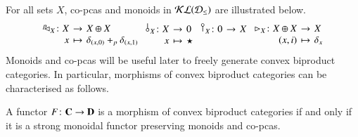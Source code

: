 For all sets $X$, co-pcas and monoids in $\mathcal{KL}(\mathcal{D}_{\leq})$ are illustrated below.
\begin{equation}\label{ex:comonoids}
\arraycolsep=2pt%
\begin{array}{cccc}
\begin{array}{rcl}
\diagp{X} \colon  X & \to & X \oplus X \\
x & \mapsto & \delta_{(x,0)}+_p\delta_{(x,1)}%
\end{array}
&
\begin{array}{rcl}
\bang{X}  \colon X & \to & \zero\\
x & \mapsto& \star
\end{array}
&
\begin{array}{rcl}
\cobang{X}\colon  \zero &\to& X\\
\text{ }
\end{array}
&
\begin{array}{rcl}
\codiag{X}  \colon  X\oplus X & \to & X\\
(x,i) & \mapsto& \delta_{x}
\end{array}
\end{array}
\end{equation}
Monoids and co-pcas will be useful later to freely generate convex biproduct categories. In particular, morphisms of convex biproduct categories  can be characterised as follows.

\begin{proposition}\label{prop: monoidal functors}
A functor $F\colon\mathbf{C}\to \mathbf{D}$ is a morphism of convex biproduct categories if and only if it is a strong monoidal functor preserving monoids and co-pcas.
\end{proposition}





